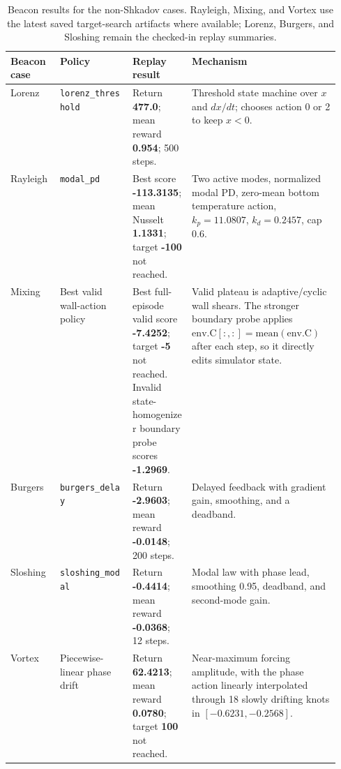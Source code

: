 \documentclass[10pt]{article}
\newcommand{\score}[1]{\textbf{#1}}
\newcommand{\code}[1]{\texttt{\small #1}}
\begin{document}
\begin{table}[H]
\centering
\small
\begin{tabularx}{\linewidth}{L{0.15\linewidth}L{0.22\linewidth}L{0.18\linewidth}Y}
\toprule
Beacon case & Policy & Replay result & Mechanism \\
\midrule
Lorenz & \code{lorenz\_threshold} & Return \score{477.0}; mean reward \score{0.954}; 500 steps. & Threshold state machine over \(x\) and \(dx/dt\); chooses action 0 or 2 to keep \(x<0\). \\
Rayleigh & \code{modal\_pd} & Best score \score{-113.3135}; mean Nusselt \score{1.1331}; target \score{-100} not reached. & Two active modes, normalized modal PD, zero-mean bottom temperature action, \(k_p=11.0807\), \(k_d=0.2457\), cap 0.6. \\
Mixing & Best valid wall-action policy & Best full-episode valid score \score{-7.4252}; target \score{-5} not reached. Invalid state-homogenizer boundary probe scores \score{-1.2969}. & Valid plateau is adaptive/cyclic wall shears. The stronger boundary probe applies \(\mathrm{env.C}[:, :] = \mathrm{mean}(\mathrm{env.C})\) after each step, so it directly edits simulator state. \\
Burgers & \code{burgers\_delay} & Return \score{-2.9603}; mean reward \score{-0.0148}; 200 steps. & Delayed feedback with gradient gain, smoothing, and a deadband. \\
Sloshing & \code{sloshing\_modal} & Return \score{-0.4414}; mean reward \score{-0.0368}; 12 steps. & Modal law with phase lead, smoothing 0.95, deadband, and second-mode gain. \\
Vortex & Piecewise-linear phase drift & Return \score{62.4213}; mean reward \score{0.0780}; target \score{100} not reached. & Near-maximum forcing amplitude, with the phase action linearly interpolated through 18 slowly drifting knots in \([-0.6231,-0.2568]\). \\
\bottomrule
\end{tabularx}
\caption{Beacon results for the non-Shkadov cases. Rayleigh, Mixing, and Vortex use the latest saved target-search artifacts where available; Lorenz, Burgers, and Sloshing remain the checked-in replay summaries.}
\end{table}
\end{document}
